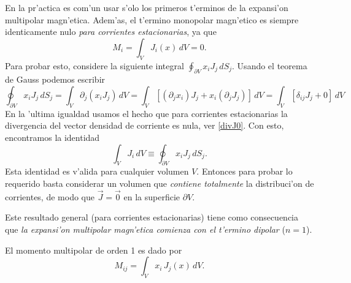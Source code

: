En la pr'actica es com'un usar s'olo los primeros t'erminos de la expansi'on
multipolar magn'etica. Adem'as, el t'ermino monopolar magn'etico es siempre
identicamente nulo \textit{para corrientes estacionarias}, ya que
\begin{equation}
 M_i=\int_V J_i(x)\,dV=0. \label{mmm0}
\end{equation}
Para probar esto, considere la siguiente integral $\oint_{\partial V}x_i
J_j\,dS_j$. Usando el teorema de Gauss podemos escribir
\begin{equation}
 \oint_{\partial V}x_i
J_j\,dS_j=\int_V\partial_j(x_iJ_j)\,dV=\int_V\left[
(\partial_jx_i)J_j+x_i(\partial_jJ_j)\right]\,dV=\int_V\left[
\delta_{ij}J_j+0\right]\,dV
\end{equation}
En la 'ultima igualdad usamos el hecho que para corrientes estacionarias la
divergencia del vector densidad de corriente es nula, ver \eqref{divJ0}. Con esto, encontramos la
identidad
\begin{equation}
  \int_VJ_i\,dV\equiv \oint_{\partial V}x_iJ_j\,dS_j.
\end{equation}
Esta identidad es v'alida para cualquier volumen $V$. Entonces para probar lo
requerido basta considerar un volumen que \textit{contiene totalmente}
la distribuci'on de corrientes, de modo que $\vec{J}=\vec{0}$ en la superficie
$\partial V$.

Este resultado general (para corrientes estacionarias) tiene como consecuencia
que \textit{la expansi'on multipolar magn'etica comienza con el t'ermino
dipolar} ($n=1$).

El momento multipolar de orden 1 es dado por
\begin{equation}
 M_{ij}=\int_V x_i\,J_j(x)\,dV.
\end{equation}

